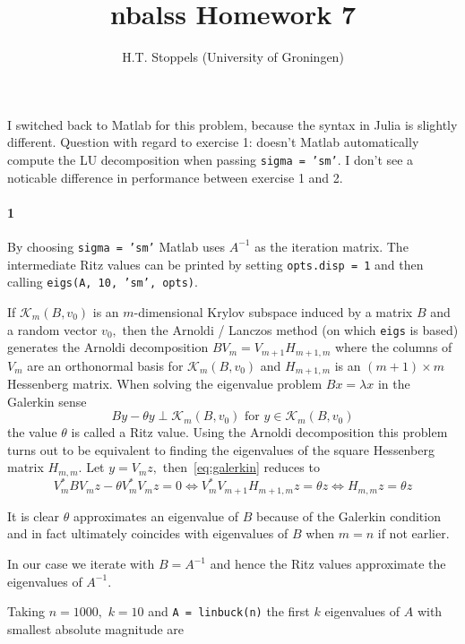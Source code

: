 \documentclass[a4paper]{article}
\author{H.T. Stoppels (University of Groningen)}
\title{{\sc nbalss} Homework 7}
\begin{document}
  \maketitle 

  I switched back to Matlab for this problem, because the syntax in Julia is slightly different. Question with regard to exercise 1: doesn't Matlab automatically compute the LU decomposition when passing {\tt sigma = 'sm'}. I don't see a noticable difference in performance between exercise 1 and 2.

  \paragraph{1} By choosing {\tt sigma = 'sm'} Matlab uses $A^{-1}$ as the iteration matrix. The intermediate Ritz values can be printed by setting {\tt opts.disp = 1} and then calling {\tt eigs(A, 10, 'sm', opts)}. 

  If $\mathcal{K}_m(B, v_0)$ is an $m$-dimensional Krylov subspace induced by a matrix $B$ and a random vector $v_0,$ then the Arnoldi / Lanczos method (on which {\tt eigs} is based) generates the Arnoldi decomposition $BV_m = V_{m+1}H_{m+1,m}$ where the columns of $V_m$ are an orthonormal basis for $\mathcal{K}_m(B, v_0)$ and $H_{m+1, m}$ is an $(m+1)\times m$ Hessenberg matrix. When solving the eigenvalue problem $Bx = \lambda x$ in the Galerkin sense
  \begin{equation}\label{eq:galerkin}
    By - \theta y \perp \mathcal{K}_m(B, v_0) \text{ for } y \in \mathcal{K}_m(B, v_0)
  \end{equation}
  the value $\theta$ is called a Ritz value. Using the Arnoldi decomposition this problem turns out to be equivalent to finding the eigenvalues of the square Hessenberg matrix $H_{m, m}.$ Let $y = V_m z,$ then~\eqref{eq:galerkin} reduces to
  \begin{equation*}
    V_m^*BV_mz - \theta V_m^*V_mz = 0 \iff V_m^*V_{m+1}H_{m+1,m}z = \theta z \iff H_{m,m}z = \theta z
  \end{equation*}

  It is clear $\theta$ approximates an eigenvalue of $B$ because of the Galerkin condition and in fact ultimately coincides with eigenvalues of $B$ when $m = n$ if not earlier.

  In our case we iterate with $B = A^{-1}$ and hence the Ritz values approximate the eigenvalues of $A^{-1}.$

  Taking $n = 1000,$ $k = 10$ and {\tt A = linbuck(n)} the first $k$ eigenvalues of $A$ with smallest absolute magnitude are 
\end{document}
